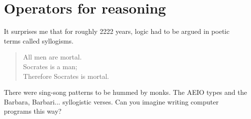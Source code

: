 \chapter{Operators for reasoning}

It surprises me that for roughly 2222 years, logic had to be argued 
in poetic terms called syllogisms.  
\begin{quote}
    All men are mortal.\\
    Socrates is a man;\\
    Therefore Socrates is mortal.
\end{quote}
There were sing-song patterns 
to be hummed by monks. The AEIO types and the Barbara, Barbari...  
syllogistic verses.
Can you imagine writing computer programs this way?

